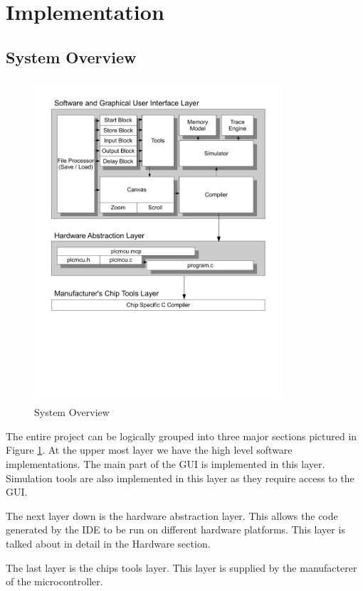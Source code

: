 \section{Implementation}
\subsection{System Overview}
\begin{figure}[htp]
    \centering
    \includegraphics[trim= 0mm 83mm 0mm 16mm, clip, width=350px]{./images/SystemOverview.pdf}
    \caption{System Overview}
    \label{fig:SystemOverview}
\end{figure}

The entire project can be logically grouped into three major sections pictured in Figure \ref{fig:SystemOverview}. At the upper most layer we have the high level software implementations. The main part of the GUI is implemented in this layer. Simulation tools are also implemented in this layer as they require access to the GUI.

The next layer down is the hardware abstraction layer. This allows the code generated by the IDE to be run on different hardware platforms. This layer is talked about in detail in the Hardware section.

The last layer is the chips tools layer. This layer is supplied by the manufacterer of the microcontroller.



